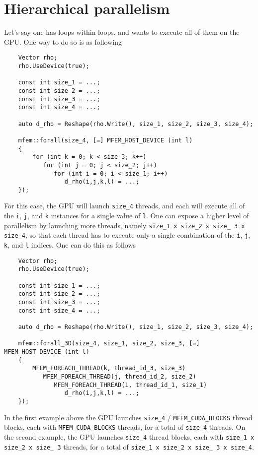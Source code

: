 \documentclass[a4paper,11pt]{article}
\begin{document}
\section{Hierarchical parallelism}
Let's say one has loops within loops, and wants to execute all of them on the GPU. One way to do so is as following
\begin{lstlisting}
    Vector rho;
    rho.UseDevice(true);

    const int size_1 = ...;
    const int size_2 = ...;
    const int size_3 = ...;
    const int size_4 = ...;

    auto d_rho = Reshape(rho.Write(), size_1, size_2, size_3, size_4);

    mfem::forall(size_4, [=] MFEM_HOST_DEVICE (int l) 
    {
        for (int k = 0; k < size_3; k++)
           for (int j = 0; j < size_2; j++)
              for (int i = 0; i < size_1; i++)
                 d_rho(i,j,k,l) = ...;
    });
\end{lstlisting}
For this case, the GPU will launch \texttt{size\_4} threads, and each will execute all of the \texttt{i}, \texttt{j}, and \texttt{k} instances for a single value of \texttt{l}. One can expose a higher level of parallelism by launching more threads, namely \texttt{size\_1 x size\_2 x size\_ 3 x size\_4}, so that each thread has to execute only a single combination of the \texttt{i}, \texttt{j}, \texttt{k}, and \texttt{l} indices. One can do this as follows
\begin{lstlisting}
    Vector rho;
    rho.UseDevice(true);

    const int size_1 = ...;
    const int size_2 = ...;
    const int size_3 = ...;
    const int size_4 = ...;

    auto d_rho = Reshape(rho.Write(), size_1, size_2, size_3, size_4);

    mfem::forall_3D(size_4, size_1, size_2, size_3, [=] MFEM_HOST_DEVICE (int l) 
    {
        MFEM_FOREACH_THREAD(k, thread_id_3, size_3)
           MFEM_FOREACH_THREAD(j, thread_id_2, size_2)
              MFEM_FOREACH_THREAD(i, thread_id_1, size_1)
                 d_rho(i,j,k,l) = ...;
    });
\end{lstlisting}
In the first example above the GPU launches \texttt{size\_4} / \texttt{MFEM\_CUDA\_BLOCKS} thread blocks, each with \texttt{MFEM\_CUDA\_BLOCKS} threads, for a total of \texttt{size\_4} threads. On the second example, the GPU launches \texttt{size\_4} thread blocks, each with \texttt{size\_1 x size\_2 x size\_ 3} threads, for a total of \texttt{size\_1 x size\_2 x size\_ 3 x size\_4}. 
\end{document}

